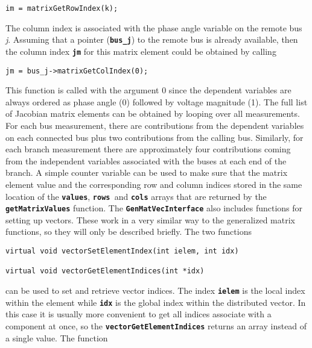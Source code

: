 {
\color{red}
\begin{Verbatim}[fontseries=b]
                im = matrixGetRowIndex(k);
\end{Verbatim}
}

The column index is associated with the phase angle variable on the remote bus \textit{j}. Assuming that a pointer (\texttt{\textbf{bus\_j}}) to the remote bus is already available, then the column index \texttt{\textbf{jm}} for this matrix element could be obtained by calling

{
\color{red}
\begin{Verbatim}[fontseries=b]
                jm = bus_j->matrixGetColIndex(0);
\end{Verbatim}
}

This function is called with the argument 0 since the dependent variables are
always ordered as phase angle (0) followed by voltage magnitude (1). The full list of Jacobian matrix elements can be obtained by looping over all measurements. For each bus measurement, there are contributions from the dependent variables on each connected bus plus two contributions from the calling bus. Similarly, for each branch measurement there are approximately four contributions coming from the independent variables associated with the buses at each end of the branch. A simple counter variable can be used to make sure that the matrix element value and the corresponding row and column indices stored in the same location of the \texttt{\textbf{values}}, \texttt{\textbf{rows }}and \texttt{\textbf{cols}} arrays that are returned by the \texttt{\textbf{getMatrixValues}} function.
The \texttt{\textbf{GenMatVecInterface}} also includes functions for setting up vectors. These work in a very similar way to the generalized matrix functions, so they will only be described briefly. The two functions

{
\color{red}
\begin{Verbatim}[fontseries=b]
virtual void vectorSetElementIndex(int ielem, int idx)

virtual void vectorGetElementIndices(int *idx)
\end{Verbatim}
}

can be used to set and retrieve vector indices. The index \texttt{\textbf{ielem}} is the local index within the element while \texttt{\textbf{idx}} is the global index within the distributed vector. In this case it is usually more convenient to get all indices associate with a component at once, so the \texttt{\textbf{vectorGetElementIndices}} returns an array instead of a single value. The function

